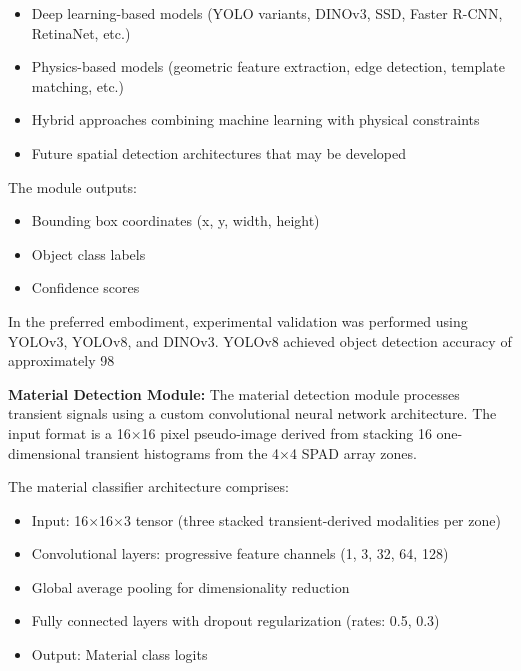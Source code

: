 \documentclass[11pt,a4paper]{article}
\begin{document}
\begin{enumerate}[leftmargin=*,label=\alph*)]
\begin{itemize}[leftmargin=*]
\item Deep learning-based models (YOLO variants, DINOv3, SSD, Faster R-CNN, RetinaNet, etc.)
\item Physics-based models (geometric feature extraction, edge detection, template matching, etc.)
\item Hybrid approaches combining machine learning with physical constraints
\item Future spatial detection architectures that may be developed
\end{itemize}

The module outputs:
\begin{itemize}[leftmargin=*]
\item Bounding box coordinates (x, y, width, height)
\item Object class labels
\item Confidence scores
\end{itemize}

In the preferred embodiment, experimental validation was performed using YOLOv3, YOLOv8, and DINOv3. YOLOv8 achieved object detection accuracy of approximately 98%

\textbf{Material Detection Module:}
The material detection module processes transient signals using a custom convolutional neural network architecture. The input format is a 16$\times$16 pixel pseudo-image derived from stacking 16 one-dimensional transient histograms from the 4$\times$4 SPAD array zones.

The material classifier architecture comprises:
\begin{itemize}[leftmargin=*]
\item Input: 16$\times$16$\times$3 tensor (three stacked transient-derived modalities per zone)
\item Convolutional layers: progressive feature channels (1, 3, 32, 64, 128)
\item Global average pooling for dimensionality reduction
\item Fully connected layers with dropout regularization (rates: 0.5, 0.3)
\item Output: Material class logits
\end{itemize}


\end{enumerate}
\end{document}
